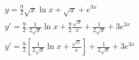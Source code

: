 \begin{ex}
\begin{align}
&y=\frac{9}{2}\sqrt{x}\ln{x}+\sqrt{x}+e^{3x}\nonumber\\
&y'=\frac{9}{2}.\frac{1}{2\sqrt{x}}\ln{x}+\frac{9}{2}\frac{\sqrt{x}}{x}+\frac{1}{2\sqrt{x}}+3e^{3x}\nonumber\\
&y'=\frac{9}{2}\left[\frac{1}{2\sqrt{x}}\ln{x}+\frac{\sqrt{x}}{x}\right]+\frac{1}{2\sqrt{x}}+3e^{3x}\nonumber
\end{align}
\end{ex}